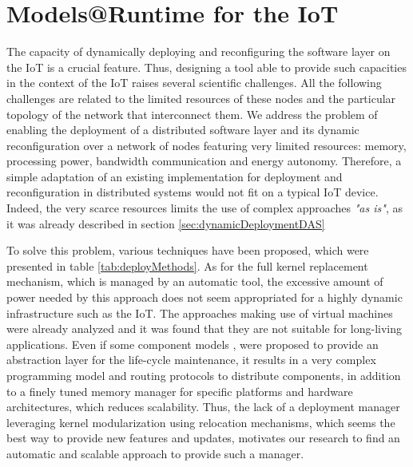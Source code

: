 \chapter{Models@Runtime for the IoT}
\label{ch:MARContiki}

The capacity of dynamically deploying and reconfiguring the software layer on the IoT is a crucial feature.
Thus, designing a tool able to provide such capacities in the context of the IoT raises several scientific challenges.
All the following challenges are related to the limited resources of these nodes and the particular topology of the network that interconnect them.
We address the problem of enabling the deployment of a distributed software layer and its dynamic reconfiguration over a network of nodes featuring very limited resources: memory, processing power, bandwidth communication and energy autonomy.
Therefore, a simple adaptation of an existing implementation for deployment and reconfiguration in distributed systems would not fit on a typical IoT device.
Indeed, the very scarce resources limits the use of complex approaches \textit{"as is"}, as it was already described in section \ref{sec:dynamicDeploymentDAS}

To solve this problem, various techniques have been proposed, which were presented in table \ref{tab:deployMethods}.
As for the full kernel replacement mechanism, which is managed by an automatic tool\cite{hui2004dynamic}, the excessive amount of power needed by this approach does not seem appropriated for a highly dynamic infrastructure such as the IoT.
The approaches making use of virtual machines were already analyzed and it was found that they are not suitable for long-living applications\cite{oliver2014reprogramming}.
Even if some component models \cite{mottola2008figaro}, \cite{taherkordi2013optimizing} were proposed to provide an abstraction layer for the life-cycle maintenance, it results in a very complex programming model and routing protocols to distribute components, in addition to a finely tuned memory manager for specific platforms and hardware architectures, which reduces scalability.
Thus, the lack of a deployment manager leveraging kernel modularization using relocation mechanisms, which seems the best way to provide new features and updates, motivates our research to find an automatic and scalable approach to provide such a manager.

